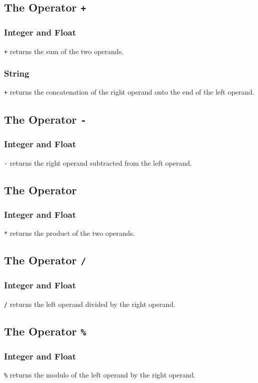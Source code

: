 \subsection{The Operator {\tt +}}
\subsubsection{Integer and Float}
\verb!+! returns the sum of the two operands.
\subsubsection{String}
\verb!+! returns the concatenation of the right operand onto the end of the left operand.

\subsection{The Operator {\tt -}}
\subsubsection{Integer and Float}
\verb!-! returns the right operand subtracted from the left operand.

\subsection{The Operator {\tt *}}
\subsubsection{Integer and Float}
\verb!*! returns the product of the two operands.

\subsection{The Operator {\tt /}}
\subsubsection{Integer and Float}
\verb!/! returns the left operand divided by the right operand.

\subsection{The Operator {\tt \%}}
\subsubsection{Integer and Float}
\verb!%! returns the modulo of the left operand by the right operand.

